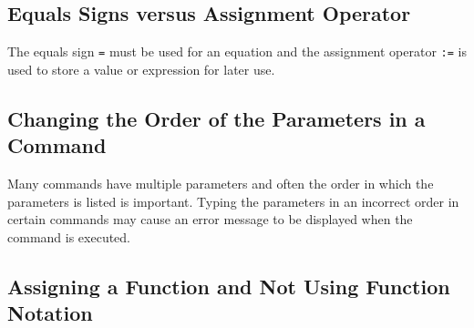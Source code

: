 \subsection{Equals Signs versus Assignment Operator}

The equals sign \texttt{=} must be used for an equation and the assignment operator \texttt{:=} is used to store a value or expression for later use.

\begin{maplegroup}
\begin{mapleinput}
\end{mapleinput}
\mapleresult
\begin{maplelatex}
\end{maplelatex}
\end{maplegroup}

\subsection{Changing the Order of the Parameters in a Command}

Many commands have multiple parameters and often the order in which the parameters is listed is important. Typing the parameters in an incorrect order in certain commands may cause an error message to be displayed when the command is executed.
\begin{maplegroup}
\begin{mapleinput}
\end{mapleinput}
\vspace{.3cm}
\mapleresult
\begin{maplelatex}

\end{maplelatex}
\end{maplegroup}

\subsection{Assigning a Function and Not Using Function Notation}

